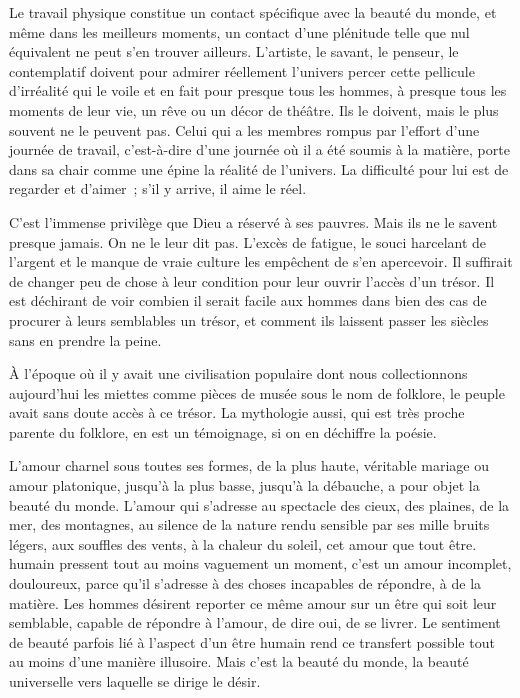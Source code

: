 \documentclass[french,twoside]{book} %
\begin{document}
Le travail physique constitue un contact spécifique avec la beauté du monde, et même dans les meilleurs moments, un contact d'une plénitude telle que nul équivalent ne peut s'en trouver ailleurs. L'artiste, le savant, le penseur, le contemplatif doivent pour admirer réellement l'univers percer cette pellicule d'irréalité qui le voile et en fait pour presque tous les hommes, à presque tous les moments de leur vie, un rêve ou un décor de théâtre. Ils le doivent, mais le plus souvent ne le peuvent pas. Celui qui a les membres rompus par l'effort d'une journée de travail, c'est-à-dire d'une journée où il a été soumis à la matière, porte dans sa chair comme une épine la réalité de l'univers. La difficulté pour lui est de regarder et d'aimer ; s'il y arrive, il aime le réel.\par
C'est l'immense privilège que Dieu a réservé à ses pauvres. Mais ils ne le savent presque jamais. On ne le leur dit pas. L'excès de fatigue, le souci harcelant de l'argent et le manque de vraie culture les empêchent de s'en apercevoir. Il suffirait de changer peu de chose à leur condition pour leur ouvrir l'accès d'un trésor. Il est déchirant de voir combien il serait facile aux hommes dans bien des cas de procurer à leurs semblables un trésor, et comment ils laissent passer les siècles sans en prendre la peine.\par
À l'époque où il y avait une civilisation populaire dont nous collectionnons aujourd'hui les miettes comme pièces de musée sous le nom de folklore, le peuple avait sans doute accès à ce trésor. La mythologie aussi, qui est très proche parente du folklore, en est un témoignage, si on en déchiffre la poésie.\par
L'amour charnel sous toutes ses formes, de la plus haute, véritable mariage ou amour platonique, jusqu'à la plus basse, jusqu'à la débauche, a pour objet la beauté du monde. L'amour qui s'adresse au spectacle des cieux, des plaines, de la mer, des montagnes, au silence de la nature rendu sensible par ses mille bruits légers, aux souffles des vents, à la chaleur du soleil, cet amour que tout être. humain pressent tout au moins vaguement un moment, c'est un amour incomplet, douloureux, parce qu'il s'adresse à des choses incapables de répondre, à de la matière. Les hommes désirent reporter ce même amour sur un être qui soit leur semblable, capable de répondre à l'amour, de dire oui, de se livrer. Le sentiment de beauté parfois lié à l'aspect d'un être humain rend ce transfert possible tout au moins d'une manière illusoire. Mais c'est la beauté du monde, la beauté universelle vers laquelle se dirige le désir.\par
\end{document}
